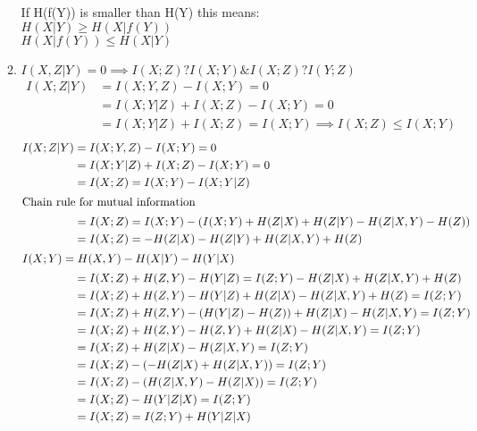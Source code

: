 \documentclass[pdftex,12pt,a4paper]{article}
\begin{document}
\begin{enumerate}
\begin{enumerate}
                If H(f(Y)) is smaller than H(Y) this means:\\
                $H(X|Y) \ge H(X|f(Y))$\\
                $H(X|f(Y)) \le H(X|Y)$
            \item $I(X,Z|Y) = 0 \implies I(X;Z) ? I(X;Y)\mathrm{ \& }I(X;Z) ? I(Y;Z)$
                \begin{align}
                    I(X;Z|Y) &= I(X;Y,Z) - I(X;Y) = 0\\
                             &= I(X;Y|Z) + I(X;Z) - I(X;Y) = 0\\
                             &= I(X;Y|Z) + I(X;Z) = I(X;Y) \implies I(X;Z) \le I(X;Y)
                \end{align}
                \begin{align}
                    I(X;Z|Y) &= I(X;Y,Z) - I(X;Y) = 0\\
                             &= I(X;Y|Z) + I(X;Z) - I(X;Y) = 0\\
                             &= I(X;Z) = I(X;Y) - I(X;Y|Z)\\
                             \intertext{Chain rule for mutual information}
                             &= I(X;Z) = I(X;Y) - (I(X;Y) + H(Z|X) + H(Z|Y) - H(Z|X,Y) - H(Z))\\
                             &= I(X;Z) = - H(Z|X) - H(Z|Y) + H(Z|X,Y) + H(Z)\\
                             \intertext{$I(X;Y)= H(X,Y) - H(X|Y) - H(Y|X)$}
                             &= I(X;Z) + H(Z,Y) - H(Y|Z) = I(Z;Y) - H(Z|X) + H(Z|X,Y) + H(Z)\\
                             &= I(X;Z) + H(Z,Y) - H(Y|Z) + H(Z|X) - H(Z|X,Y) + H(Z) = I(Z;Y)\\
                             &= I(X;Z) + H(Z,Y) - (H(Y|Z) - H(Z)) + H(Z|X) - H(Z|X,Y) = I(Z;Y)\\
                             &= I(X;Z) + H(Z,Y) - H(Z,Y) + H(Z|X) - H(Z|X,Y) = I(Z;Y)\\
                             &= I(X;Z) + H(Z|X) - H(Z|X,Y) = I(Z;Y)\\
                             &= I(X;Z) - (-H(Z|X) + H(Z|X,Y)) = I(Z;Y)\\
                             &= I(X;Z) - (H(Z|X,Y) - H(Z|X)) = I(Z;Y)\\
                             &= I(X;Z) - H(Y|Z|X) = I(Z;Y)\\
                             &= I(X;Z) = I(Z;Y) + H(Y|Z|X)\\

\end{align}
\end{enumerate}
\end{enumerate}
\end{document}
